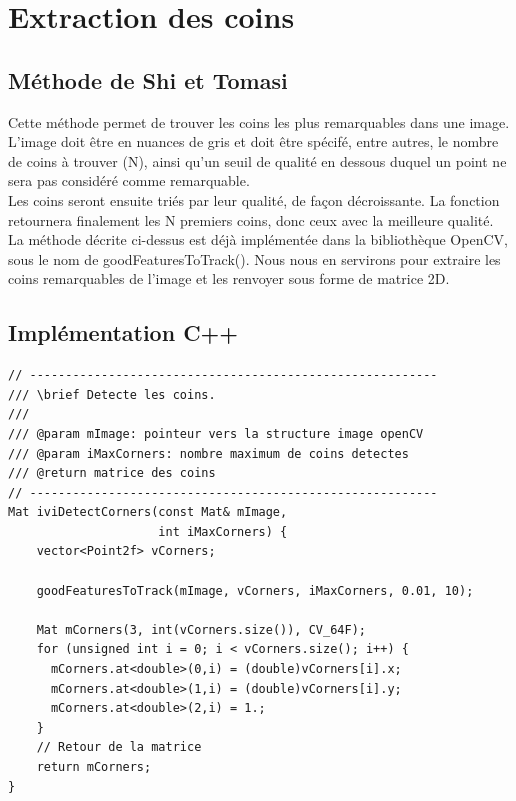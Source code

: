 \documentclass[a4paper]{article}
\begin{document}
\section{Extraction des coins}

\subsection{Méthode de Shi et Tomasi}
Cette méthode permet de trouver les coins les plus remarquables dans une image.
L'image doit être en nuances de gris et doit être spécifé, entre autres, le nombre de coins à trouver (N), ainsi qu'un seuil de qualité en dessous duquel un point ne sera pas considéré comme remarquable.\\

Les coins seront ensuite triés par leur qualité, de façon décroissante. La fonction retournera finalement les N premiers coins, donc ceux avec la meilleure qualité.\\

La méthode décrite ci-dessus est déjà implémentée dans la bibliothèque OpenCV, sous le nom de goodFeaturesToTrack(). Nous nous en servirons pour extraire les coins remarquables de l'image et les renvoyer sous forme de matrice 2D.

\subsection{Implémentation C++}

\begin{lstlisting}
// ---------------------------------------------------------
/// \brief Detecte les coins.
///
/// @param mImage: pointeur vers la structure image openCV
/// @param iMaxCorners: nombre maximum de coins detectes
/// @return matrice des coins
// ---------------------------------------------------------
Mat iviDetectCorners(const Mat& mImage,
                     int iMaxCorners) {
    vector<Point2f> vCorners;

    goodFeaturesToTrack(mImage, vCorners, iMaxCorners, 0.01, 10);

    Mat mCorners(3, int(vCorners.size()), CV_64F);
    for (unsigned int i = 0; i < vCorners.size(); i++) {
      mCorners.at<double>(0,i) = (double)vCorners[i].x;
      mCorners.at<double>(1,i) = (double)vCorners[i].y;
      mCorners.at<double>(2,i) = 1.;
    }
    // Retour de la matrice
    return mCorners;
}
\end{lstlisting}

\clearpage
\end{document}
